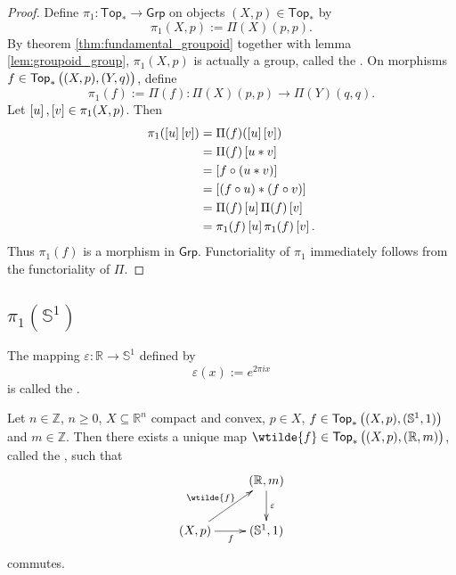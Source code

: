 \begin{proof}
	Define $\pi_1 : \mathsf{Top}_\ast \to \mathsf{Grp}$ on objects $(X,p) \in \mathsf{Top}_\ast$ by 
	\begin{equation*}
		\pi_1(X,p) := \Pi(X)(p,p).
	\end{equation*}
	By theorem \ref{thm:fundamental_groupoid} together with lemma \ref{lem:groupoid_group}, $\pi_1(X,p)$ is actually a group, called the . On morphisms $f \in \mathsf{Top}_\ast\del[1]{(X,p),(Y,q)}$, define 
	\begin{equation*}
		\pi_1(f) := \Pi(f) : \Pi(X)(p,p) \to \Pi(Y)(q,q).
	\end{equation*}
	Let $\sbr{u},\sbr{v} \in \pi_1(X,p)$. Then 
	\begin{align*}
		\pi_1(\sbr{u}\sbr{v}) &= \Pi(f)(\sbr{u}\sbr{v})\\
		&= \Pi(f)\sbr{u \ast v}\\
		&= \sbr[0]{f \circ (u \ast v)}\\
		&= \sbr[0]{(f \circ u) \ast (f \circ v)}\\
		&= \Pi(f)\sbr{u} \Pi(f)\sbr{v}\\
		&= \pi_1(f)\sbr{u}\pi_1(f)\sbr{v}.
	\end{align*}
	Thus $\pi_1(f)$ is a morphism in $\mathsf{Grp}$. Functoriality of $\pi_1$ immediately follows from the functoriality of $\Pi$.
\end{proof}

\subsection*{$\pi_1(\mathbb{S}^1)$} 

\begin{definition}
	The mapping $\varepsilon : \mathbb{R} \to \mathbb{S}^1$ defined by
	\begin{equation}
		\varepsilon(x) := e^{2\pi i x}
	\end{equation}
	\noindent is called the .
\end{definition}

\begin{proposition}
	Let $n \in \mathbb{Z}$, $n \geq 0$, $X \subseteq \mathbb{R}^n$ compact and convex, $p \in X$, $f \in \mathsf{Top}_\ast\del[1]{(X,p),(\mathbb{S}^1,1)}$ and $m \in \mathbb{Z}$. Then there exists a unique map $\wtilde{f} \in \mathsf{Top}_\ast\del[1]{(X,p),(\mathbb{R},m)}$, called the , such that 
	\begin{equation*}
		\centering
		\xymatrix{
			& (\mathbb{R},m) \ar[d]^\varepsilon\\
			(X,p) \ar[r]_f\ar[ur]^{\wtilde{f}}	& (\mathbb{S}^1,1)
		}
		\end{equation*}
		\noindent commutes. 
		\label{prop:lifting_circle}
	\end{proposition}

